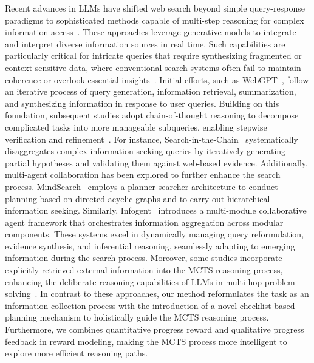 Recent advances in LLMs have shifted web search beyond simple query-response paradigms to sophisticated methods capable of multi-step reasoning for complex information access~\cite{chen2024mindsearch, reddy2024infogent}. These approaches leverage generative models to integrate and interpret diverse information sources in real time. Such capabilities are particularly critical for intricate queries that require synthesizing fragmented or context-sensitive data, where conventional search systems often fail to maintain coherence or overlook essential insights~\cite{hoveyda2024aqa, khotdecomposed}.
Initial efforts, such as WebGPT~\cite{nakano2021webgpt}, follow an iterative process of query generation, information retrieval, summarization, and synthesizing information in response to user queries.
Building on this foundation, subsequent studies adopt chain-of-thought reasoning to decompose complicated tasks into more manageable subqueries, enabling stepwise verification and refinement~\cite{yao2023react, trivedi2023interleaving}. For instance, Search-in-the-Chain~\cite{xu2024search} systematically disaggregates complex information-seeking queries by iteratively generating partial hypotheses and validating them against web-based evidence. 
Additionally, multi-agent collaboration has been explored to further enhance the search process. 
MindSearch~\cite{chen2024mindsearch} employs a planner-searcher architecture to conduct planning based on directed acyclic graphs and to carry out hierarchical information seeking. Similarly, Infogent~\cite{reddy2024infogent} introduces a multi-module collaborative agent framework that orchestrates information aggregation across modular components.
These systems excel in dynamically managing query reformulation, evidence synthesis, and inferential reasoning, seamlessly adapting to emerging information during the search process.
Moreover, some studies incorporate explicitly retrieved external information into the MCTS reasoning process, enhancing the deliberate reasoning capabilities of LLMs in multi-hop problem-solving~\cite{lee2024zero, jiang2024rag}. In contrast to these approaches, our method reformulates the task as an information collection process with the introduction of a novel checklist-based planning mechanism to holistically guide the MCTS reasoning process. Furthermore, we combines quantitative progress reward and qualitative progress feedback in reward modeling, making the MCTS process more intelligent to explore more efficient reasoning paths.
